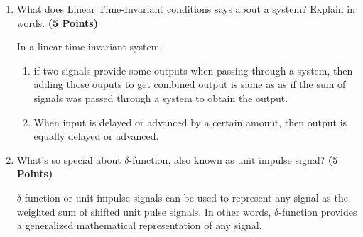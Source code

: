 \documentclass[12pt, xcolor=dvipsnames,svgnames,x11names]{article}
\begin{document}
\begin{enumerate}
\begin{tcolorbox}
We consider that a unit rectangula pulse has area under the curve unity or 1. So, considering that, when $\Delta \to 0$, i.e. width of the pulse approahes zero, height approaches infinity, and unit rectangular pulse tends to become an unit impulse signal.
    
\end{tcolorbox}

\item What does Linear Time-Invariant conditions says about a system? Explain in words. \hfill \textbf{(5 Points)}


\begin{tcolorbox}[
    enhanced,
    colback=androidBlueLight!80,
    colframe=androidBlue,
    arc=5pt,
    boxrule=1pt,
    title=\textbf{Answer},
    fonttitle=\bfseries,
    coltitle=black,
    top=10pt,
    bottom=8pt,
    left=8pt,
    right=8pt,
    attach boxed title to top left={xshift=10pt, yshift=-\tcboxedtitleheight/2},
    boxed title style={
    colback=androidBlue,    
        colframe=androidBlue,
        arc=3pt,
        boxrule=0pt,
        left=6pt, right=6pt,
        top=3pt, bottom=3pt
    }
    ]
In a linear time-invariant system, 

\begin{enumerate}
\item if two signals provide some outputs when passing through a system, then adding those ouputs to get combined output is same as as if the sum of signals was passed through a system to obtain the output.
\item When input is delayed or advanced by a certain amount, then output is equally delayed or advanced.

\end{enumerate}

\end{tcolorbox}

\item What's so special about $\delta$-function, also known as unit impulse signal?
\hfill \textbf{(5 Points)}
 
\begin{tcolorbox}[
    enhanced,
    colback=androidBlueLight!80,
    colframe=androidBlue,
    arc=5pt,
    boxrule=1pt,
    title=\textbf{Answer},
    fonttitle=\bfseries,
    coltitle=black,
    top=10pt,
    bottom=8pt,
    left=8pt,
    right=8pt,
    attach boxed title to top left={xshift=10pt, yshift=-\tcboxedtitleheight/2},
    boxed title style={
    colback=androidBlue,    
        colframe=androidBlue,
        arc=3pt,
        boxrule=0pt,
        left=6pt, right=6pt,
        top=3pt, bottom=3pt
    }
    ]
    
$\delta$-function or unit impulse signals can be used to represent any signal as the weighted sum of shifted unit pulse signals. In other words, $\delta$-function provides a generalized mathematical representation of any signal.

\end{tcolorbox}

\end{enumerate}
\end{document}
